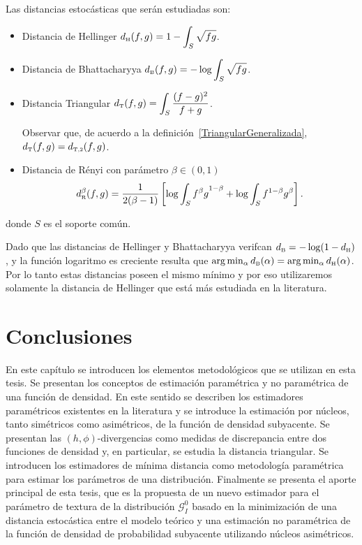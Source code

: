 Las distancias estocásticas que serán estudiadas son:

\begin{itemize}
	\item Distancia de Hellinger $d_\text{\tiny H}(f,g)=1-\displaystyle{\int_{S}\sqrt{fg}}$.
	
	\item Distancia de Bhattacharyya $d_\text{\tiny B}(f,g)=-\log\displaystyle{\int_{S}\sqrt{fg }}$.
	
	\item Distancia Triangular $d_\text{\tiny T}(f,g)=\displaystyle{\int_{S}\frac{(f-g)^2}{f+g}}$.
	
	Observar que, de acuerdo a la definición~\ref{TriangularGeneralizada}, $d_\text{\tiny T}(f,g)=d_{\text{\tiny{T,2}}}(f,g)$.
	
	\item Distancia de R\'enyi con parámetro $\beta\in(0,1)$
	$$
	d_\text{\tiny R}^{\beta}(f,g)=\frac{1}{2(\beta-1)}\left[\log\displaystyle{\int_{S}{f^{\beta}g}^{1-\beta}}+\log\displaystyle{\int_{S}f^{1-\beta}g^{\beta}}\right].
	$$
\end{itemize}
donde $S$ es el soporte común.

Dado que las distancias de Hellinger y Bhattacharyya verifcan $d_\text{\tiny B}=-\log(1-d_\text{\tiny H})$, y la función logaritmo es creciente resulta que $\arg\min_\alpha d_\text{\tiny B}(\alpha )=\arg\min_ \alpha d_\text{\tiny H}(\alpha )$. Por lo tanto estas distancias poseen el mismo mínimo y por eso utilizaremos solamente la distancia de Hellinger que está más estudiada en la literatura.

\section{Conclusiones}

En este capítulo se introducen los elementos metodológicos que se utilizan en esta tesis. Se presentan los conceptos de estimación paramétrica y no paramétrica de una función de densidad. En este sentido se describen los estimadores  paramétricos existentes en la literatura y se introduce la estimación por núcleos, tanto simétricos como asimétricos, de la función de densidad subyacente.  Se  presentan las $(h,\phi)$-divergencias como medidas de discrepancia entre dos funciones de densidad y, en particular, se estudia la distancia triangular. Se introducen los estimadores de mínima distancia como metodología paramétrica para estimar los parámetros de una distribución. Finalmente se presenta el aporte principal de esta tesis, que es la propuesta de un nuevo estimador para el parámetro de textura de la distribución $\mathcal{G}_I^0$ basado en la minimización de una distancia estocástica entre el modelo teórico y una estimación no paramétrica de la función de densidad de probabilidad subyacente utilizando núcleos asimétricos.